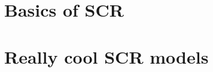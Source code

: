\documentclass{book}
\begin{document}






\part{Basics of SCR}














\part{Really cool SCR models}













\end{document}
